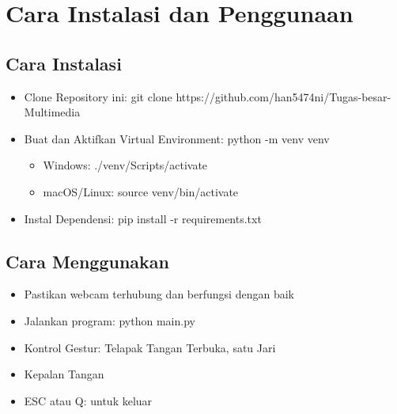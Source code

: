 \documentclass[11pt,a4paper]{article}
\begin{document}
\newpage
\section{Cara Instalasi dan Penggunaan}
    \subsection{Cara Instalasi}
    \begin{itemize}
        \item Clone Repository ini: git clone https://github.com/han5474ni/Tugas-besar-Multimedia
   \item Buat dan Aktifkan Virtual Environment: python -m venv venv
   \begin{itemize}
       \item Windows: ./venv/Scripts/activate
       \item macOS/Linux: source venv/bin/activate
   \end{itemize}
   \item Instal Dependensi: pip install -r requirements.txt
    \end{itemize}
   \subsection{Cara Menggunakan}
    \begin{itemize}
        \item Pastikan webcam terhubung dan berfungsi dengan baik
        \item Jalankan program: python main.py
        \item Kontrol Gestur: Telapak Tangan Terbuka, satu Jari
        \item Kepalan Tangan
        \item ESC atau Q: untuk keluar
    \end{itemize}
    
\newpage


\end{document}
